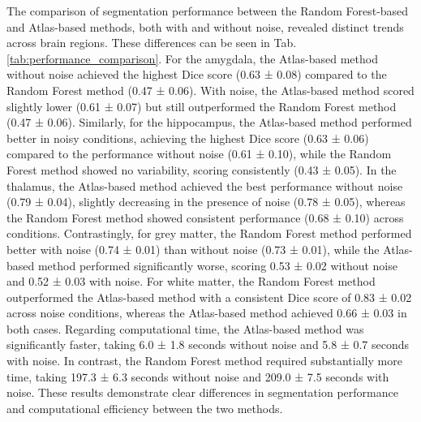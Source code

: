 The comparison of segmentation performance between the Random Forest-based and Atlas-based methods, both with and without noise, revealed distinct trends across brain regions. These differences can be seen in Tab. \ref{tab:performance_comparison}. For the amygdala, the Atlas-based method without noise achieved the highest Dice score (0.63 ± 0.08) compared to the Random Forest method (0.47 ± 0.06). With noise, the Atlas-based method scored slightly lower (0.61 ± 0.07) but still outperformed the Random Forest method (0.47 ± 0.06). Similarly, for the hippocampus, the Atlas-based method performed better in noisy conditions, achieving the highest Dice score (0.63 ± 0.06) compared to the performance without noise (0.61 ± 0.10), while the Random Forest method showed no variability, scoring consistently (0.43 ± 0.05).
In the thalamus, the Atlas-based method achieved the best performance without noise (0.79 ± 0.04), slightly decreasing in the presence of noise (0.78 ± 0.05), whereas the Random Forest method showed consistent performance (0.68 ± 0.10) across conditions. Contrastingly, for grey matter, the Random Forest method performed better with noise (0.74 ± 0.01) than without noise (0.73 ± 0.01), while the Atlas-based method performed significantly worse, scoring 0.53 ± 0.02 without noise and 0.52 ± 0.03 with noise. For white matter, the Random Forest method outperformed the Atlas-based method with a consistent Dice score of 0.83 ± 0.02 across noise conditions, whereas the Atlas-based method achieved 0.66 ± 0.03 in both cases.
Regarding computational time, the Atlas-based method was significantly faster, taking 6.0 ± 1.8 seconds without noise and 5.8 ± 0.7 seconds with noise. In contrast, the Random Forest method required substantially more time, taking 197.3 ± 6.3 seconds without noise and 209.0 ± 7.5 seconds with noise. These results demonstrate clear differences in segmentation performance and computational efficiency between the two methods.
